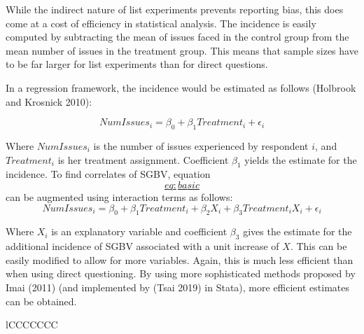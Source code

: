 \documentclass[
]{article}
\begin{document}
While the indirect nature of list experiments prevents reporting bias,
this does come at a cost of efficiency in statistical analysis. The
incidence is easily computed by subtracting the mean of issues faced in
the control group from the mean number of issues in the treatment group.
This means that sample sizes have to be far larger for list experiments
than for direct questions.

In a regression framework, the incidence would be estimated as follows
(Holbrook and Krosnick 2010):

\[\label{eq:basic}
NumIssues_i = \beta_0 + \beta_1 Treatment_i + \epsilon_i\]

Where \(NumIssues_i\) is the number of issues experienced by respondent
\(i\), and \(Treatment_i\) is her treatment assignment. Coefficient
\(\beta_1\) yields the estimate for the incidence. To find correlates of
SGBV, equation \hyperref[eq:basic]{\[eq:basic\]} can be augmented using
interaction terms as follows: \[\label{eq:interaction}
NumIssues_i = \beta_0 + \beta_1 Treatment_i + \beta_2 X_i + \beta_3 Treatment_i X_i + \epsilon_i\]

Where \(X_i\) is an explanatory variable and coefficient \(\beta_3\)
gives the estimate for the additional incidence of SGBV associated with
a unit increase of \(X\). This can be easily modified to allow for more
variables. Again, this is much less efficient than when using direct
questioning. By using more sophisticated methods proposed by Imai (2011)
(and implemented by (Tsai 2019) in Stata), more efficient estimates can
be obtained.

lCCCCCCC
\end{document}
